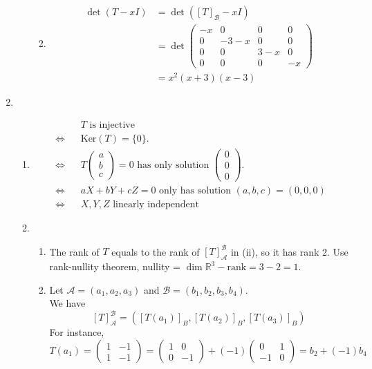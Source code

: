 \documentclass[12pt]{article}
\newcommand{\kerne}{\mathrm{Ker}}
\theoremstyle{definition}
\begin{document}
\begin{enumerate}
\begin{enumerate}
\begin{enumerate}
\[    \]
    \item \begin{align*}\det(T-xI)&=\det([T]_\mathcal{B}-xI)\\
         &= \det \begin{pmatrix}-x&0&0&0\\0&-3-x&0&0\\0&0&3-x&0\\0&0&0&-x\end{pmatrix}\\
         &=x^2(x+3)(x-3)
    \end{align*}
  \end{enumerate}
  \end{enumerate}
  \item \begin{enumerate}
  \item  \begin{align*}
  &T \text{ is injective}\\
  \Leftrightarrow\;\;\;&\kerne(T)=\{0\}.\\
  \Leftrightarrow\;\;\;&T\begin{pmatrix}a\\b\\c\end{pmatrix}=0\text{ has only solution }\begin{pmatrix}0\\0\\0\end{pmatrix}. \\
  \Leftrightarrow\;\;\;&aX+bY+cZ = 0\text{ only has solution }(a,b,c) = (0,0,0)\\
  \Leftrightarrow\;\;\;&X,Y,Z\text{ linearly independent}
  \end{align*}
  \item \begin{enumerate}
\item The rank of $T$ equals to the rank of $[T]_\mathcal{A}^\mathcal{B}$ in (ii), so it has rank 2. Use rank-nullity theorem, nullity = $\dim \mathbb{R}^3-\text{rank} = 3-2 = 1$.
  \item Let $\mathcal{A}=(a_1,a_2,a_3)$ and $\mathcal{B}=(b_1,b_2,b_3,b_4)$. \\We have
  \[
[T]_\mathcal{A}^\mathcal{B} = ([T(a_1)]_B,[T(a_2)]_B,[T(a_3)]_B)
  \]
  For instance,
  \[
T(a_1) = \begin{pmatrix}1&-1\\1&-1\end{pmatrix} = \begin{pmatrix}1&0\\0&-1\end{pmatrix}+(-1)\begin{pmatrix}0&1\\-1&0\end{pmatrix} = b_2+(-1)b_4
\]
\end{enumerate}
\end{enumerate}
\end{enumerate}
\end{document}
